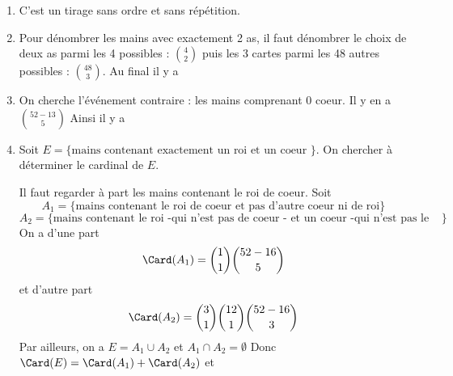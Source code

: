 \documentclass[a4paper, 11pt,reqno]{article}
\begin{document}
\begin{correction}
\begin{enumerate}
\item C'est un tirage sans ordre et sans répétition. 
\item Pour dénombrer les mains avec exactement 2 as, il faut dénombrer le choix de deux as parmi les 4 possibles : $\binom{4}{2}$ puis les 3 cartes parmi les 48 autres possibles : $\binom{48}{3}$. Au final il y  a 
\item On cherche l'événement contraire : les mains comprenant 0 coeur. Il y en a 
$\binom{52-13}{5}$ Ainsi il y  a
\item Soit $E=\{ \text{mains contenant  exactement un roi et un coeur }\}$. On chercher à déterminer le cardinal de $E$. 

Il faut regarder à part les mains contenant le roi de coeur. 
Soit $$A_1= \{ \text{mains contenant le roi de coeur et pas d'autre coeur ni de roi}\}$$
$$A_2= \{ \text{mains contenant le roi -qui n'est pas de coeur - et un coeur -qui n'est pas le roi.}\}$$
On a d'une part 
$$\Card(A_1) =  \binom{1}{1} \binom{52-16}{5} $$
et d'autre part
$$\Card(A_2) =  \binom{3}{1} \binom{12}{1} \binom{52-16}{3}$$
Par ailleurs, on a $E=A_1\cup A_2$ et $A_1\cap A_2=\emptyset$
Donc $\Card(E) = \Card(A_1) +\Card(A_2)$ et 




\end{enumerate}
\end{correction}






\vspace{0.6cm}
\end{document}
